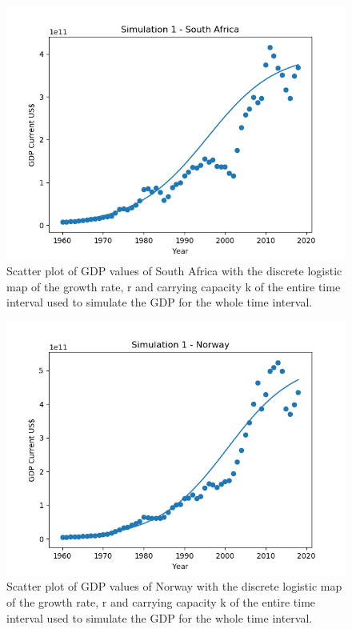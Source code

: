 \documentclass[11pt,a4paper]{CLabBookTemplate} %
\begin{document}
\begin{figure}[h!]
	\centering
	\includegraphics[width = 120mm]{Figures/RSASim.png}
	\caption{Scatter plot of GDP values of South Africa with the discrete logistic map of the growth rate, r and carrying capacity k of the entire time interval used to simulate the GDP for the whole time interval.}
	\label{fig:RSASim}
\end{figure}
\begin{figure}[h!]
	\centering
	\includegraphics[width = 120mm]{Figures/NORSim.png}
	\caption{Scatter plot of GDP values of Norway with the discrete logistic map of the growth rate, r and carrying capacity k of the entire time interval used to simulate the GDP for the whole time interval.}
	\label{fig:NORSim}
\end{figure}
\end{document}
